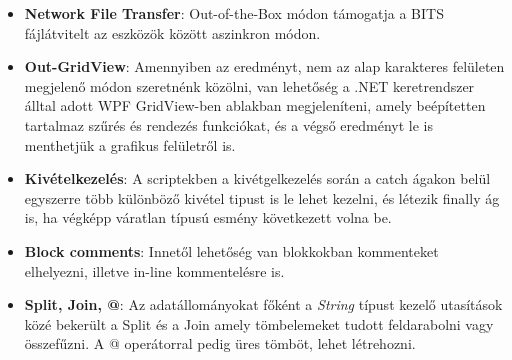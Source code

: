 \documentclass[12pt,oneside,justify,table]{book}
\begin{document}
\begin{itemize}
	\item \textbf{Network File Transfer}: Out-of-the-Box módon támogatja a BITS fájlátvitelt az eszközök között aszinkron módon.
	\item \textbf{Out-GridView}: Amennyiben az eredményt, nem az alap karakteres felületen megjelenő módon szeretnénk közölni, van lehetőség a .NET keretrendszer álltal adott WPF GridView-ben ablakban megjeleníteni, amely beépítetten tartalmaz szűrés és rendezés funkciókat, és a végső eredményt le is menthetjük a grafikus felületről is.
	\item \textbf{Kivételkezelés}: A scriptekben a kivétgelkezelés során a catch ágakon belül egyszerre több különböző kivétel tipust is le lehet kezelni, és létezik finally ág is, ha végképp váratlan típusú esmény következett volna be. 
	\item \textbf{Block comments}: Innetől lehetőség van blokkokban kommenteket elhelyezni, illetve in-line kommentelésre is. 
	\item \textbf{Split, Join, @}: Az adatállományokat főként a \textit{String} típust kezelő utasítások közé bekerült a Split és a Join amely tömbelemeket tudott feldarabolni vagy összefűzni. A @ operátorral pedig üres tömböt, lehet létrehozni.
\end{itemize}
\end{document}
